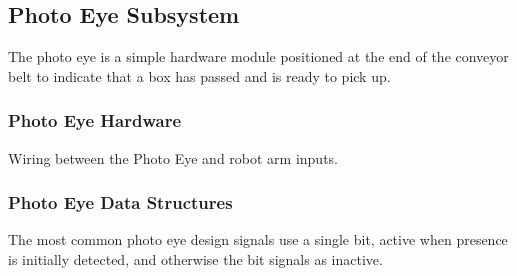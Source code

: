 \subsection{Photo Eye Subsystem}
The photo eye is a simple hardware module positioned at the end of the conveyor belt to indicate that a box has passed and is ready to pick up. 

\subsubsection{Photo Eye Hardware}
Wiring between the Photo Eye and robot arm inputs.

\subsubsection{Photo Eye Data Structures}
The most common photo eye design signals use a single bit, active when presence is initially detected, and otherwise the bit signals as inactive.
